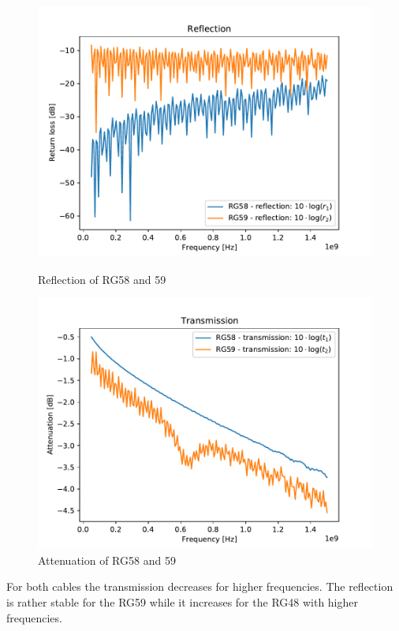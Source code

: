 \begin{figure}[tbp]
\begin{minipage}{0.49\textwidth}
        \centering
        \includegraphics[width=1.1\linewidth]{../../part5/reflection.pdf}
        \caption{Reflection of RG58 and 59}
        \label{fig:refl}
    \end{minipage}\hfill
    \begin{minipage}{0.49\textwidth}
        \centering
        \includegraphics[width=1.1\linewidth]{../../part5/transmission.pdf}
        \caption{Attenuation of RG58 and 59}
        \label{fig:trans}
    \end{minipage}
\end{figure}
For both cables the transmission decreases for higher frequencies. The reflection is rather stable for the RG59 while it increases for the RG48 with higher frequencies.\\
